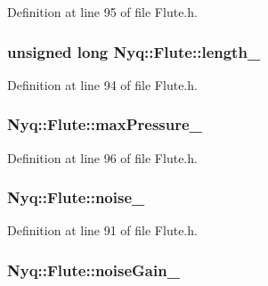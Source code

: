 Definition at line 95 of file Flute.\+h.

\subsubsection[{\texorpdfstring{length\+\_\+}{length_}}]{\setlength{\rightskip}{0pt plus 5cm}unsigned long Nyq\+::\+Flute\+::length\+\_\+\hspace{0.3cm}{\ttfamily [protected]}}\hypertarget{class_nyq_1_1_flute_a370736a905a96a64dfbdd2a333c5183f}{}\label{class_nyq_1_1_flute_a370736a905a96a64dfbdd2a333c5183f}


Definition at line 94 of file Flute.\+h.

\subsubsection[{\texorpdfstring{max\+Pressure\+\_\+}{maxPressure_}}]{ Nyq\+::\+Flute\+::max\+Pressure\+\_\+\hspace{0.3cm}{\ttfamily [protected]}}\hypertarget{class_nyq_1_1_flute_ad3e12b0d0d09b2506b818a7d63602ca0}{}\label{class_nyq_1_1_flute_ad3e12b0d0d09b2506b818a7d63602ca0}


Definition at line 96 of file Flute.\+h.

\subsubsection[{\texorpdfstring{noise\+\_\+}{noise_}}]{ Nyq\+::\+Flute\+::noise\+\_\+\hspace{0.3cm}{\ttfamily [protected]}}\hypertarget{class_nyq_1_1_flute_a507de5716893c377ea197ef0642d9fdb}{}\label{class_nyq_1_1_flute_a507de5716893c377ea197ef0642d9fdb}


Definition at line 91 of file Flute.\+h.

\subsubsection[{\texorpdfstring{noise\+Gain\+\_\+}{noiseGain_}}]{ Nyq\+::\+Flute\+::noise\+Gain\+\_\+\hspace{0.3cm}{\ttfamily [protected]}}\hypertarget{class_nyq_1_1_flute_ab7b644e9fd03249172b037f5576688c1}{}\label{class_nyq_1_1_flute_ab7b644e9fd03249172b037f5576688c1}



